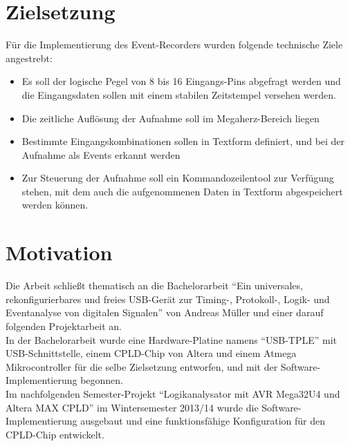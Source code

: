\clearpage

\section{Zielsetzung}
\label{ch:Einfuehrung:Zielsetzung}

Für die Implementierung des Event-Recorders wurden folgende technische Ziele angestrebt:
\begin{itemize}
\item Es soll der logische Pegel von 8 bis 16 Eingangs-Pins abgefragt werden und die Eingangsdaten sollen mit einem stabilen Zeitstempel versehen werden.
\item Die zeitliche Auflösung der Aufnahme soll im Megaherz-Bereich liegen
\item Bestimmte Eingangskombinationen sollen in Textform definiert, und bei der Aufnahme als Events erkannt werden
\item Zur Steuerung der Aufnahme soll ein Kommandozeilentool zur Verfügung stehen, mit dem auch die aufgenommenen Daten in Textform abgespeichert werden können.
\end{itemize} 


\section{Motivation}
\label{ch:Einfuehrung:Motivation}

Die Arbeit schließt thematisch an die Bachelorarbeit ``Ein universales, rekonfigurierbares und freies USB-Gerät zur Timing-, Protokoll-, Logik- und Eventanalyse von digitalen Signalen'' von Andreas Müller und einer darauf folgenden Projektarbeit an.\\
In der Bachelorarbeit wurde eine Hardware-Platine namens ``USB-TPLE'' mit USB-Schnittstelle, einem \acrshort{CPLD}-Chip von Altera und einem Atmega Mikrocontroller für die selbe Zielsetzung entworfen, und mit der Software-Implementierung begonnen\cite{ba:mueller}.\\  
Im nachfolgenden Semester-Projekt ``Logikanalysator mit AVR Mega32U4 und Altera MAX CPLD'' im Wintersemester 2013/14 wurde die Software-Implementierung ausgebaut und eine funktionsfähige Konfiguration für den CPLD-Chip entwickelt.\\

